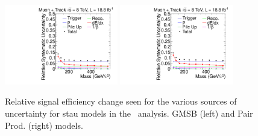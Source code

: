\begin{figure}[ht]
\centering
  \includegraphics[clip=true, trim=0.0cm 0cm 2.8cm 0cm, width=0.44\textwidth]{figures/tkmu/MuGMStauUncertainty}
  \includegraphics[clip=true, trim=0.0cm 0cm 2.8cm 0cm, width=0.44\textwidth]{figures/tkmu/MuPPStauUncertainty} \\
\caption[Relative signal efficiency change seen for the various sources of uncertainty for stau models in the \tktof\ analysis]
{Relative signal efficiency change seen for the various sources of uncertainty for stau models in the \tktof\ analysis.
GMSB (left) and Pair Prod. (right) models.}
    \label{fig:TkMuStauUncSource}
\end{figure}

